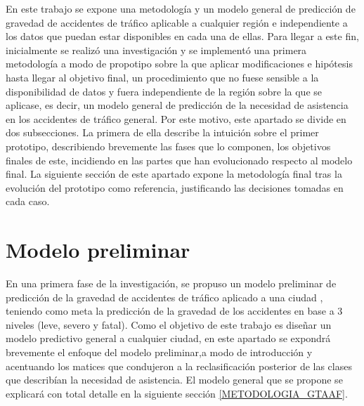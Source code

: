 \documentclass{uathesis-es}
\begin{document}
En este trabajo se expone una metodología y un modelo general de predicción de gravedad de accidentes de tráfico aplicable a cualquier región e independiente a los datos que puedan estar disponibles en cada una de ellas. Para llegar a este fin, inicialmente se realizó una investigación y se implementó una primera metodología a modo de propotipo sobre la que aplicar modificaciones e hipótesis hasta llegar al objetivo final, un procedimiento que no fuese sensible a la disponibilidad de datos y fuera independiente de la región sobre la que se aplicase, es decir, un modelo general de predicción de la necesidad de asistencia en los accidentes de tráfico general. Por este motivo, este apartado se divide en dos subsecciones. La primera de ella describe la intuición sobre el primer prototipo, describiendo brevemente las fases que lo componen, los objetivos finales de este, incidiendo en las partes que han evolucionado respecto al modelo final. La siguiente sección de este apartado expone la metodología final tras la evolución del prototipo como referencia, justificando las decisiones tomadas en cada caso.


\section{Modelo preliminar}
\label{METODOLOGIA_MODELO_PRELIMINAR}



En una primera fase de la investigación, se propuso un modelo preliminar de predicción de la gravedad de accidentes de tráfico aplicado a una ciudad \cite{PEREZSALA2023113245}, teniendo como meta la predicción de la gravedad de los accidentes en base a 3 niveles (leve, severo y fatal). Como el objetivo de este trabajo es diseñar un modelo predictivo general a cualquier ciudad, en este apartado se expondrá brevemente el enfoque del modelo preliminar,a modo de introducción y acentuando los matices que condujeron a la reclasificación posterior de las clases que describían la necesidad de asistencia. El modelo general que se propone se explicará con total detalle en la siguiente sección \ref{METODOLOGIA_GTAAF}.
\end{document}
